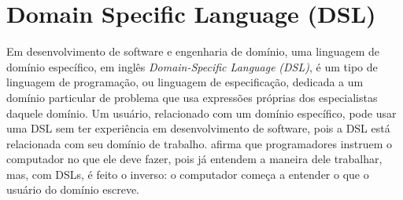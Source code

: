 \section{Domain Specific Language (DSL)\foreignlanguage{brazil}{ }}

%
Em desenvolvimento de software e engenharia de domínio, uma linguagem
de domínio específico, em inglês \foreignlanguage{english}{\emph{Domain-Specific
Language}}\emph{ (DSL)}, é um tipo de linguagem de programação, ou
linguagem de especificação, dedicada a um domínio particular de problema
que usa expressões próprias dos especialistas daquele domínio. Um
usuário, relacionado com um domínio específico, pode usar uma DSL
sem ter experiência em desenvolvimento de software, pois a DSL está
relacionada com seu domínio de trabalho. \citet{fowler2010domain}
afirma que programadores instruem o computador no que ele deve fazer,
pois já entendem a maneira dele trabalhar, mas, com \foreignlanguage{english}{DSLs,}
é feito o inverso: o computador começa a entender o que o usuário
do domínio escreve.

